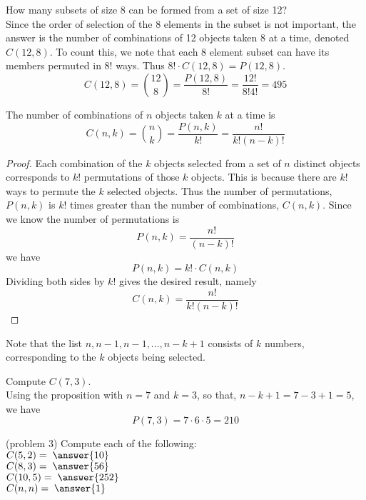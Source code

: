 \documentclass[handout]{ximera}
\begin{document}
\begin{example}[example 2]
How many subsets of size 8 can be formed from a set of size 12?\\
Since the order of selection of the 8 elements in the subset is not important, the answer is the number of combinations of 12 objects taken 8 at a time, denoted $C(12,8)$.  To count this, we note that each 8 element subset can have its members permuted in $8!$ ways. Thus $8! \cdot C(12,8) = P(12,8)$.
\[
C(12,8) = \binom{12}{8} = \frac{P(12,8)}{8!} = \frac{12!}{8!4!} =  495
\]
\end{example}
\begin{proposition}
The number of combinations of $n$ objects taken $k$ at a time is
\[
C(n,k) = \binom{n}{k} = \frac{P(n,k)}{k!} = \frac{n!}{k!(n-k)!}
\]

\end{proposition}
\begin{proof}
Each combination of the $k$ objects selected from a set of $n$ distinct objects 
corresponds to $k!$ permutations of those $k$ objects.  
This is because there are $k!$ ways to permute the $k$ selected objects.
Thus the number of permutations, $P(n,k)$ is $k!$ times greater than the 
number of combinations, $C(n,k)$. Since we know the number of permutations is 
\[
P(n,k) = \frac{n!}{(n-k)!}
\]
we have
\[
P(n,k) = k!\cdot C(n,k)
\]
Dividing both sides by $k!$ gives the desired result, namely
\[
C(n,k) = \frac{n!}{k!(n-k)!}
\]


\end{proof}
\begin{remark}
Note that the list $n, n-1, n-1, ..., n-k+1$ consists of $k$ numbers, corresponding to the $k$ objects being selected.
\end{remark}

\begin{example}[example 3]
Compute $C(7, 3)$.\\
Using the proposition with $n = 7$ and $k = 3$, so that, $n-k+1 = 7-3+1 = 5$, we have
\[
P(7,3) = 7 \cdot 6 \cdot 5 = 210
\]
\end{example}


\begin{problem}(problem 3)
Compute each of the following:\\
$C(5,2) = \; \answer{10}$\\
$C(8,3) = \; \answer{56}$\\
$C(10,5) = \; \answer{252}$\\
$C(n,n) = \; \answer{1}$
\end{problem}
\end{document}
